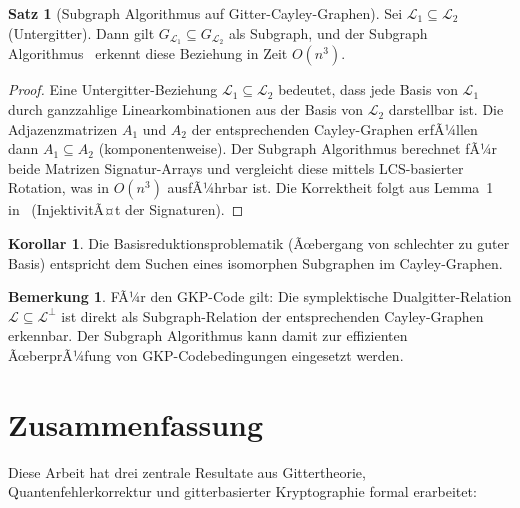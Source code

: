 ﻿\documentclass[a4paper,12pt]{article}
\theoremstyle{definition}
\newtheorem{satz}{Satz}
\newtheorem{korollar}{Korollar}
\newtheorem{bemerkung}{Bemerkung}
\newcommand{\Lat}{\mathcal{L}}
\begin{document}
\begin{satz}[Subgraph Algorithmus auf Gitter-Cayley-Graphen]
\label{satz:subgraph_gitter}
Sei $\Lat_1 \subseteq \Lat_2$ (Untergitter). Dann gilt $G_{\Lat_1} \subseteq G_{\Lat_2}$
als Subgraph, und der Subgraph Algorithmus~\cite{Epp2026Subgraph} erkennt diese
Beziehung in Zeit $O(n^3)$.
\end{satz}

\begin{proof}
Eine Untergitter-Beziehung $\Lat_1 \subseteq \Lat_2$ bedeutet, dass jede Basis von $\Lat_1$
durch ganzzahlige Linearkombinationen aus der Basis von $\Lat_2$ darstellbar ist.
Die Adjazenzmatrizen $A_1$ und $A_2$ der entsprechenden Cayley-Graphen erfÃ¼llen dann
$A_1 \subseteq A_2$ (komponentenweise).
Der Subgraph Algorithmus berechnet fÃ¼r beide Matrizen Signatur-Arrays und vergleicht diese
mittels LCS-basierter Rotation, was in $O(n^3)$ ausfÃ¼hrbar ist.
Die Korrektheit folgt aus Lemma~1 in~\cite{Epp2026Subgraph} (InjektivitÃ¤t der Signaturen).
\end{proof}

\begin{korollar}
Die Basisreduktionsproblematik (Ãœbergang von schlechter zu guter Basis)
entspricht dem Suchen eines isomorphen Subgraphen im Cayley-Graphen.
\end{korollar}

\begin{bemerkung}
FÃ¼r den GKP-Code gilt: Die symplektische Dualgitter-Relation $\Lat \subseteq \Lat^\perp$
ist direkt als Subgraph-Relation der entsprechenden Cayley-Graphen erkennbar.
Der Subgraph Algorithmus kann damit zur effizienten ÃœberprÃ¼fung von GKP-Codebedingungen
eingesetzt werden.
\end{bemerkung}

\section{Zusammenfassung}

Diese Arbeit hat drei zentrale Resultate aus Gittertheorie, Quantenfehlerkorrektur
und gitterbasierter Kryptographie formal erarbeitet:
\end{document}
